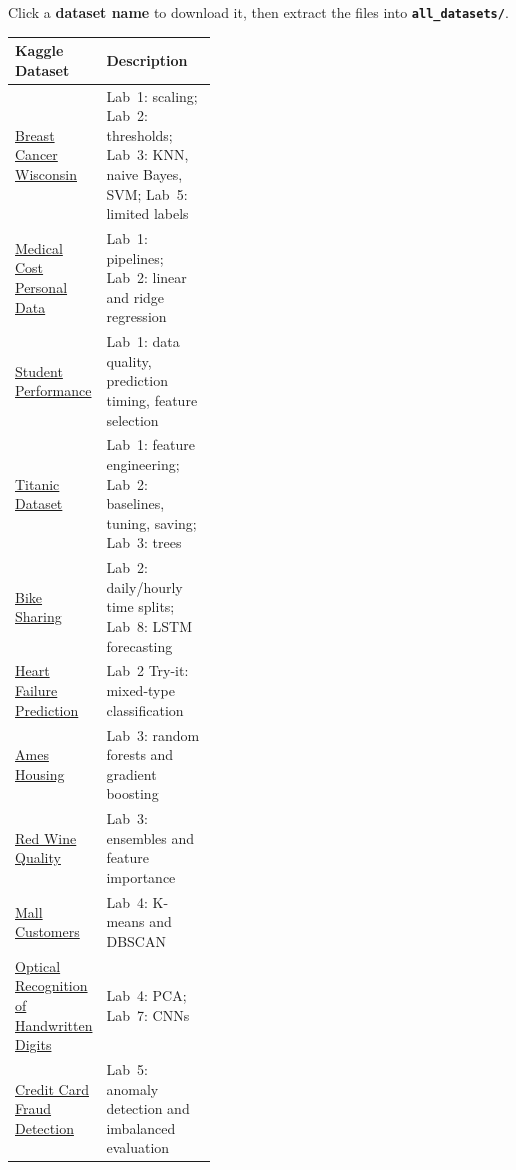 Click a \textbf{dataset name} to download it, then extract the files into \textbf{\texttt{all\_datasets/}}.

\begin{mltable}
\footnotesize
\renewcommand{\arraystretch}{1.0}
\setlength{\tabcolsep}{4pt}
\begin{tabularx}{\linewidth}{@{}>{\raggedright\arraybackslash}p{0.40\linewidth}>{\raggedright\arraybackslash}X@{}}
\toprule
\rowcolor{MLPaleBlue!92}
\textbf{Kaggle Dataset} & \textbf{Description} \\
\midrule
\href{https://www.kaggle.com/datasets/uciml/breast-cancer-wisconsin-data}{Breast Cancer Wisconsin} & Lab~1: scaling; Lab~2: thresholds; Lab~3: KNN, naive Bayes, SVM; Lab~5: limited labels \\
\href{https://www.kaggle.com/datasets/mirichoi0218/insurance}{Medical Cost Personal Data} & Lab~1: pipelines; Lab~2: linear and ridge regression \\
\href{https://www.kaggle.com/datasets/larsen0966/student-performance-data-set}{Student Performance} & Lab~1: data quality, prediction timing, feature selection \\
\href{https://www.kaggle.com/datasets/yasserh/titanic-dataset}{Titanic Dataset} & Lab~1: feature engineering; Lab~2: baselines, tuning, saving; Lab~3: trees \\
\href{https://www.kaggle.com/datasets/lakshmi25npathi/bike-sharing-dataset}{Bike Sharing} & Lab~2: daily/hourly time splits; Lab~8: LSTM forecasting \\
\href{https://www.kaggle.com/datasets/fedesoriano/heart-failure-prediction}{Heart Failure Prediction} & Lab~2 Try-it: mixed-type classification \\
\href{https://www.kaggle.com/datasets/shashanknecrothapa/ames-housing-dataset}{Ames Housing} & Lab~3: random forests and gradient boosting \\
\href{https://www.kaggle.com/datasets/uciml/red-wine-quality-cortez-et-al-2009}{Red Wine Quality} & Lab~3: ensembles and feature importance \\
\href{https://www.kaggle.com/datasets/vjchoudhary7/customer-segmentation-tutorial-in-python}{Mall Customers} & Lab~4: K-means and DBSCAN \\
\href{https://www.kaggle.com/datasets/yadavhim/optical-recognition-of-handwritten-digits}{Optical Recognition of Handwritten Digits} & Lab~4: PCA; Lab~7: CNNs \\
\href{https://www.kaggle.com/datasets/miadul/credit-card-fraud-detection-dataset}{Credit Card Fraud Detection} & Lab~5: anomaly detection and imbalanced evaluation \\
\bottomrule
\end{tabularx}
\end{mltable}

